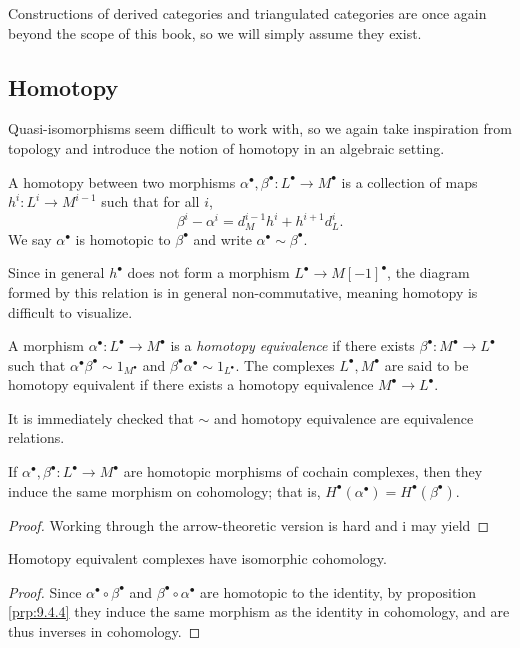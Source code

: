 Constructions of derived categories and triangulated categories are once again beyond the scope of this book, so we will simply assume they exist.

\subsection{Homotopy}
Quasi-isomorphisms seem difficult to work with, so we again take inspiration from topology and introduce the notion of homotopy in an algebraic setting.
\begin{definition}[Homotopy]\label{dfn:9.4.3}
	A homotopy between two morphisms $\alpha ^\bullet ,\beta ^\bullet : L^\bullet  \to M^\bullet $ is a collection of maps $h^i : L^i \to M^{i-1} $ such that for all $i$,
	\[
		\beta ^i-\alpha ^i=d_{M}^{i-1}h^i+h^{i+1} d_L^i
	.\]
	We say $\alpha ^\bullet $ is homotopic to $\beta ^\bullet $ and write $\alpha ^\bullet \sim \beta ^\bullet $.
\end{definition}

Since in general $h^\bullet $ does not form a morphism $L^\bullet \to M[-1]^\bullet $, the diagram formed by this relation is in general non-commutative, meaning homotopy is difficult to visualize.

\begin{definition}\label{dfn:4.9.4}
	A morphism $\alpha ^\bullet : L^\bullet  \to M^\bullet $ is a \emph{homotopy equivalence} if there exists $\beta ^\bullet : M^\bullet  \to L^\bullet $ such that $\alpha ^\bullet \beta ^\bullet \sim 1_{M^\bullet } $ and $\beta ^\bullet \alpha ^\bullet \sim 1_{L^\bullet } $. The complexes $L^\bullet ,M^\bullet $ are said to be homotopy equivalent if there exists a homotopy equivalence $M^\bullet \to L^\bullet $.
\end{definition}

It is immediately checked that $\sim $ and homotopy equivalence are equivalence relations.

\begin{proposition}\label{prp:9.4.4}
	If $\alpha^{\bullet}, \beta ^{\bullet} : L^{\bullet}  \to M^{\bullet} $ are homotopic morphisms of cochain complexes, then they induce the same morphism on cohomology; that is, $H^{\bullet} (\alpha ^{\bullet} )=H^{\bullet} (\beta ^{\bullet} )$.
\end{proposition}
\begin{proof}
	Working through the arrow-theoretic version is hard and i may yield
\end{proof}
\begin{corollary}\label{cor:9.4.1}
	Homotopy equivalent complexes have isomorphic cohomology.
\end{corollary}
\begin{proof}
	Since $\alpha ^{\bullet} \circ \beta ^{\bullet} $ and $\beta ^{\bullet} \circ \alpha ^{\bullet} $ are homotopic to the identity, by proposition \ref{prp:9.4.4} they induce the same morphism as the identity in cohomology, and are thus inverses in cohomology.
\end{proof}


